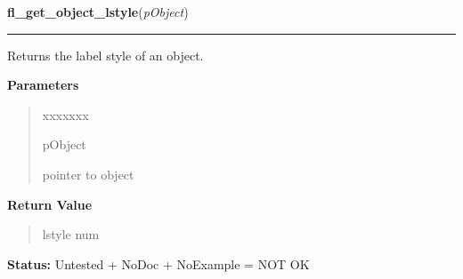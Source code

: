 \hspace{.8\funcindent}\begin{boxedminipage}{\funcwidth}

    \raggedright \textbf{fl\_get\_object\_lstyle}(\textit{pObject})

    \vspace{-1.5ex}

    \rule{\textwidth}{0.5\fboxrule}
\setlength{\parskip}{2ex}
    Returns the label style of an object.

\setlength{\parskip}{1ex}
      \textbf{Parameters}
      \vspace{-1ex}

      \begin{quote}
        \begin{Ventry}{xxxxxxx}

          \item[pObject]

          pointer to object

        \end{Ventry}

      \end{quote}

      \textbf{Return Value}
    \vspace{-1ex}

      \begin{quote}
      lstyle num

      \end{quote}

\textbf{Status:} Untested + NoDoc + NoExample = NOT OK



    \end{boxedminipage}

    \label{xformslib:library:fl_set_object_lcol}

    \vspace{0.5ex}


